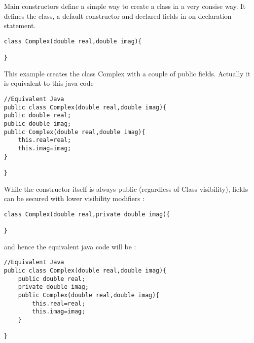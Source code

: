 \documentclass{tufte-book}
\begin{document}
            Main constructors define a simple way to create a class in a very consise way. It defines the class, a default  constructor and  declared fields in on declaration statement.
            \begin{lstlisting}
class Complex(double real,double imag){

}
            \end{lstlisting}

            This example creates the class Complex with a couple of public fields. Actually it is equivalent to this java code

            \begin{lstlisting}
//Equivalent Java
public class Complex(double real,double imag){
public double real;
public double imag;
public Complex(double real,double imag){
    this.real=real;
    this.imag=imag;
}

}
            \end{lstlisting}


            While the constructor itself is always public (regardless of Class visibility), fields can be secured with lower visibility modifiers :

            \begin{lstlisting}
class Complex(double real,private double imag){

}
            \end{lstlisting}
            and hence the equivalent java code will be :

            \begin{lstlisting}
//Equivalent Java
public class Complex(double real,double imag){
    public double real;
    private double imag;
    public Complex(double real,double imag){
        this.real=real;
        this.imag=imag;
    }

}
            \end{lstlisting}
\end{document}
